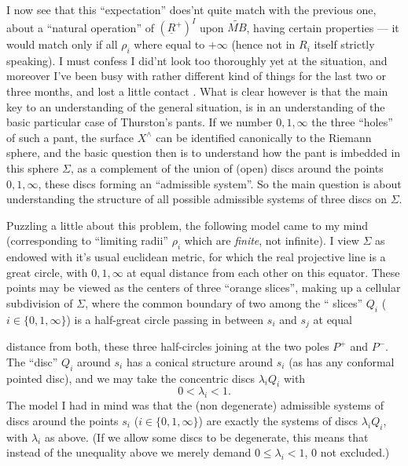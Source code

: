 \documentclass[11pt,a4paper]{article}
\begin{document}
I now see that this “expectation” does'nt quite match with the previous one,
about a “natural operation” of $(\underline{R}^{+})^{I}$ upon $\widetilde{MB}$,
having certain properties — it would match only if all $\rho_{i}$ where equal
to $+\infty$ (hence not in $R_{i}$ itself strictly speaking). I must confess I
did'nt look too thoroughly yet at the situation, and moreover I've been busy
with rather different kind of things for the last two or three months, and
lost a little contact . What is clear however is that the
main key to an understanding of the general situation, is in an understanding
of the basic particular case of Thurston's pants. If we number $0, 1, \infty$
the three “holes” of such a pant, the surface $X^{\wedge}$ can be identified
canonically to the Riemann sphere, and the basic question then is to
understand how the pant is imbedded in this sphere $\Sigma$, as a complement
of  the union of (open) discs around the points
$0, 1, \infty$, these discs forming an “admissible system”. So the main
question is about understanding the structure of all possible admissible
systems of three discs on $\Sigma$.

Puzzling a little about this problem, the following model came to my mind
(corresponding to “limiting radii” $\rho_{i}$ which are \emph{finite}, not
infinite). I view $\Sigma$ as endowed with it's usual euclidean metric, for
which the real projective line is a great circle, with $0, 1, \infty$ at
equal distance from each other on this equator. These points may be viewed
as the centers of three “orange  slices”, making up a
cellular subdivision of $\Sigma$, where the common boundary of two among the
“ slices” $Q_{i}$ ($i \in \{0, 1, \infty\}$) is a
half-great circle passing in between $s_{i}$ and $s_{j}$ at equal

distance from both, these three half-circles joining at the two poles $P^{+}$
and $P^{-}$. The “disc” $Q_{i}$ around $s_{i}$ has a conical structure around
$s_{i}$ (as has any conformal pointed disc), and we may take the concentric
 discs $\lambda_{i} Q_{i}$ with
\[
  0 < \lambda_{i} < 1 .
\]
The model I had in mind was that the (non degenerate) admissible systems of
discs around the points $s_{i}$ ($i \in \{0, 1, \infty\}$) \struck{\ill{}}
are exactly the systems of discs $\lambda_{i} Q_{i}$, with $\lambda_{i}$ as
above. (If we allow some discs to be degenerate, this means that instead of
the unequality above we merely demand $0 \leqslant \lambda_{i} < 1$, 0 not
excluded.)
\end{document}
